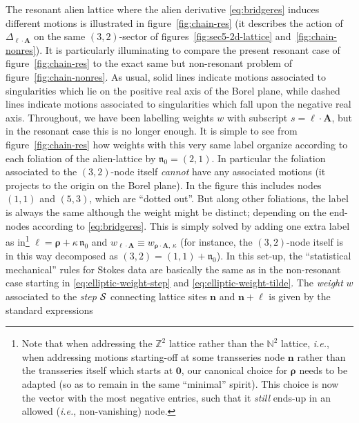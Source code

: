 \documentclass[11pt,a4paper]{article}
\newcommand{\CS}{{\cal S}}
\def\BN{{\mathbb N}}
\def\BZ{{\mathbb Z}}
\newcommand{\nres}{\boldsymbol{\mathfrak{n}}_0}
\begin{document}
The resonant alien lattice where the alien derivative \eqref{eq:bridgeres} induces different motions is illustrated in figure~\ref{fig:chain-res} (it describes the action of $\Delta_{\boldsymbol{\ell} \cdot \boldsymbol{A}}$ on the same $(3,2)$-sector of figures~\ref{fig:sec5-2d-lattice} and~\ref{fig:chain-nonres}). It is particularly illuminating to compare the present resonant case of figure~\ref{fig:chain-res} to the exact same but non-resonant problem of figure~\ref{fig:chain-nonres}. As usual, solid lines indicate motions associated to singularities which lie on the positive real axis of the Borel plane, while dashed lines indicate motions associated to singularities which fall upon the negative real axis. Throughout, we have been labelling weights $w$ with subscript $s = \boldsymbol{\ell} \cdot \boldsymbol{A}$, but in the resonant case this is no longer enough. It is simple to see from figure~\ref{fig:chain-res} how weights with this very same label organize according to each foliation of the alien-lattice by $\nres = (2,1)$. In particular the foliation associated to the $(3,2)$-node itself \textit{cannot} have any associated motions (it projects to the origin on the Borel plane). In the figure this includes nodes $(1,1)$ and $(5,3)$, which are ``dotted out''. But along other foliations, the label is always the same although the weight might be distinct; depending on the end-nodes according to \eqref{eq:bridgeres}. This is simply solved by adding one extra label as in\footnote{Note that when addressing the $\BZ^2$ lattice rather than the $\BN^2$ lattice, \textit{i.e.}, when addressing motions starting-off at some transseries node $\boldsymbol{n}$ rather than the transseries itself which starts at $\boldsymbol{0}$, our canonical choice for $\boldsymbol{\rho}$ needs to be adapted (so as to remain in the same ``minimal'' spirit). This choice is now the vector with the most negative entries, such that it \textit{still} ends-up in an allowed (\textit{i.e.}, non-vanishing) node.} $\boldsymbol{\ell} = \boldsymbol{\rho} + \kappa\, \nres$ and $w_{\boldsymbol{\ell} \cdot \boldsymbol{A}} \equiv w_{\boldsymbol{\rho} \cdot \boldsymbol{A},\, \kappa}$ (for instance, the $(3,2)$-node itself is in this way decomposed as $(3,2) = (1,1) + \nres$). In this set-up, the ``statistical mechanical'' rules for Stokes data are basically the same as in the non-resonant case starting in \eqref{eq:elliptic-weight-step} and \eqref{eq:elliptic-weight-tilde}. The \textit{weight} $w$ associated to the \textit{step} $\CS$ connecting lattice sites $\boldsymbol{n}$ and $\boldsymbol{n} + \boldsymbol{\ell}$ is given by the standard expressions
\end{document}
